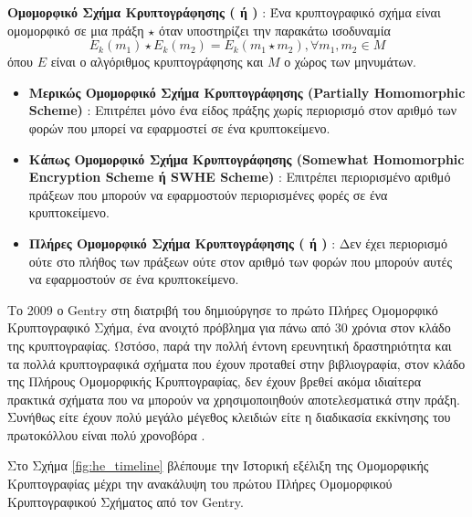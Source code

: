 \begin{definition}
\textbf{Ομομορφικό Σχήμα Κρυπτογράφησης ( ή )} : Ένα κρυπτογραφικό σχήμα είναι ομομορφικό σε μια πράξη $\star$ όταν υποστηρίζει την παρακάτω ισοδυναμία
\begin{equation}
E_k(m_1) \star E_k(m_2) = E_k(m_1 \star m_2), \forall m_1, m_2 \in M
\end{equation}
όπου $E$ είναι ο αλγόριθμος κρυπτογράφησης και $M$ ο χώρος των μηνυμάτων.
\end{definition}

\begin{definition}
\begin{itemize}[leftmargin=*]
\textbf{Κύριες Κατηγορίες Ομομορφικής Κρυπτογράφησης} :
\item \textbf{Μερικώς Ομομορφικό Σχήμα Κρυπτογράφησης (Partially Homomorphic Scheme)} : Επιτρέπει μόνο ένα είδος πράξης χωρίς περιορισμό στον αριθμό των φορών που μπορεί να εφαρμοστεί σε ένα κρυπτοκείμενο.
\item \textbf{Κάπως Ομομορφικό Σχήμα Κρυπτογράφησης (Somewhat Homomorphic Encryption Scheme ή SWHE Scheme)} : Επιτρέπει περιορισμένο αριθμό πράξεων που μπορούν να εφαρμοστούν περιορισμένες φορές σε ένα κρυπτοκείμενο.
\item \textbf{Πλήρες Ομομορφικό Σχήμα Κρυπτογράφησης ( ή )} : Δεν έχει περιορισμό ούτε στο πλήθος των πράξεων ούτε στον αριθμό των φορών που μπορούν αυτές να εφαρμοστούν σε ένα κρυπτοκείμενο.
\end{itemize}
\end{definition}

Το 2009 ο Gentry στη διατριβή του \cite{10.1145/1536414.1536440} δημιούργησε το πρώτο Πλήρες Ομομορφικό Κρυπτογραφικό Σχήμα, ένα ανοιχτό πρόβλημα για πάνω από 30 χρόνια στον κλάδο της κρυπτογραφίας. Ωστόσο, παρά την πολλή έντονη ερευνητική δραστηριότητα και τα πολλά κρυπτογραφικά σχήματα που έχουν προταθεί στην βιβλιογραφία, στον κλάδο της Πλήρους Ομομορφικής Κρυπτογραφίας, δεν έχουν βρεθεί ακόμα ιδιαίτερα πρακτικά σχήματα που να μπορούν να χρησιμοποιηθούν αποτελεσματικά στην πράξη. Συνήθως είτε έχουν πολύ μεγάλο μέγεθος κλειδιών είτε η διαδικασία εκκίνησης του πρωτοκόλλου είναι πολύ χρονοβόρα \cite{10.1007/978-3-642-20465-4_9}.

Στο Σχήμα \ref{fig:he_timeline} βλέπουμε την Ιστορική εξέλιξη της Ομομορφικής Κρυπτογραφίας μέχρι την ανακάλυψη του πρώτου Πλήρες Ομομορφικού Κρυπτογραφικού Σχήματος από τον Gentry.

